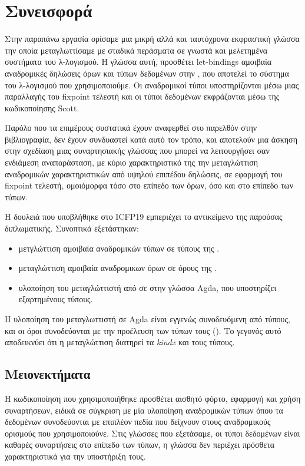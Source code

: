 \section{Συνεισφορά}
Στην παραπάνω εργασία ορίσαμε μια μικρή αλλά και ταυτόχρονα εκφραστική γλώσσα 
την οποία μεταγλωττίσαμε με σταδικά περάσματα σε γνωστά και μελετημένα συστήματα του λ-λογισμού. 
Η γλώσσα αυτή, \FIR{} προσθέτει let-bindings αμοιβαία αναδρομικές δηλώσεις όρων και τύπων δεδομένων
στην \FOMF, που αποτελεί το σύστημα του λ-λογισμού που χρησιμοποιούμε. Οι αναδρομικοί τύποι
υποστηρίζονται μέσω μιας παραλλαγής του fixpoint τελεστή και οι τύποι δεδομένων εκφράζονται
μέσω της κωδικοποίησης Scott.

Παρόλο που τα επιμέρους συστατικά έχουν αναφερθεί στο παρελθόν στην βιβλιογραφία, δεν έχουν
συνδυαστεί κατά αυτό τον τρόπο, και αποτελούν μια άσκηση στην σχεδίαση μιας συναρτησιακής 
γλώσσας που μπορεί να λειτουργήσει σαν ενδιάμεση αναπαράσταση, με κύριο χαρακτηριστικό της
την μεταγλώττιση αναδρομικών χαρακτηριστικών από υψηλού επιπέδου δηλώσεις, σε εφαρμογή
του fixpoint τελεστή, ομοιόμορφα τόσο στο επίπεδο των όρων, όσο και στο επίπεδο των τύπων.

Η δουλειά που υποβλήθηκε στο ICFP19 εμπεριέχει το αντικείμενο της παρούσας διπλωματικής. Συνοπτικά
εξετάστηκαν:
\begin{itemize}
\item μετγλώττιση αμοιβαία αναδρομικών τύπων σε τύπους της \FOMF{}.
\item μεταγλώττιση αμοιβαία αναδρομικων όρων σε όρους της \FOMF{}.
\item υλοποίηση του μεταγλώττιστή από \FIR{} σε \FOMF{} στην γλώσσα Agda, που υποστηρίζει
εξαρτημένους τύπους.

\end{itemize}
Η υλοποίηση του μεταγλωττιστή σε Agda είναι εγγενώς συνοδευόμενη από τύπους, και οι όροι συνοδεύονται με την προέλευση των τύπων τους (\cite{altenkirch}). Το γεγονός αυτό αποδεικνύει ότι η μεταγλώττιση διατηρεί τα \emph{kindx} και τους τύπους. 


\subsection{Μειονεκτήματα}

Η κωδικοποίηση που χρησιμοποιήθηκε προσθέτει αισθητό φόρτο, εφαρμογή και χρήση συναρτήσεων, ειδικά
σε σύγκριση με μία υλοποίηση αναδρομικών τύπων όπου τα δεδομένων συνοδεύονται με επιπλέον πεδία που
δείχνουν στους αναδρομικούς ορισμούς που χρησιμοποιούνε. Στις γλώσσες που εξετάσαμε, οι τύποι δεδομένων είναι καθαρές συναρτήσεις στο επίπεδο των τύπων, η γλώσσα δεν περιέχει πρόσθετα χαρακτηριστικά για την υποστήριξη τους.


